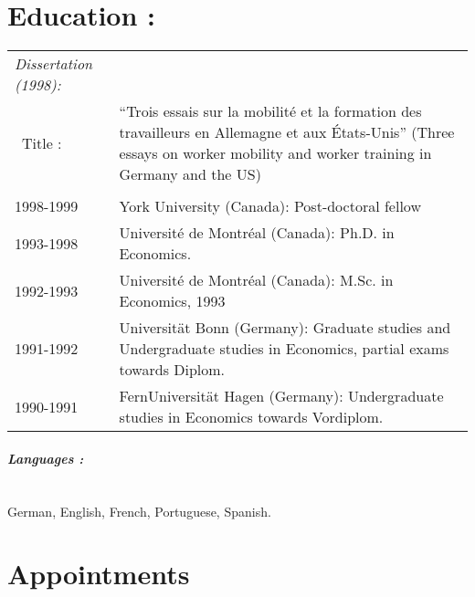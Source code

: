 \documentclass[12pt,letterpaper]{report}
\begin{document}
\section*{Education :}

\begin{tabular}{lp{4in}}
	\it Dissertation (1998): \\
	\ Title :&``Trois essais sur la mobilit\'e et la formation des travailleurs en Allemagne et aux
	\'Etats-Unis'' (Three essays on worker mobility and worker training in
	Germany and the US)\\
	\\
	1998-1999   &    York University (Canada): Post-doctoral fellow \\
	1993-1998   &    Universit\'e de Montr\'eal (Canada): Ph.D. in Economics. \\
	1992-1993   &    Universit\'e de Montr\'eal (Canada): M.Sc. in Economics, 1993 \\
	1991-1992   &    Universit\"at Bonn (Germany): Graduate studies and Undergraduate studies in Economics, partial exams towards Diplom.     \\
	1990-1991   &    FernUniversit\"at Hagen (Germany): Undergraduate studies in Economics towards Vordiplom. \\
\end{tabular}

\paragraph{\it \bf Languages :}
\ \\
German, English, French, Portuguese, Spanish. 

\section*{Appointments}
\end{document}

